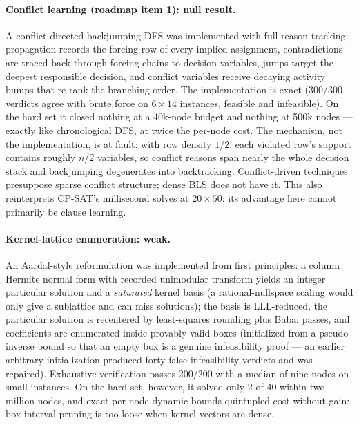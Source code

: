 \documentclass[12pt]{article}
\begin{document}
\paragraph{Conflict learning (roadmap item 1): null result.} A conflict-directed backjumping DFS was implemented with full reason tracking: propagation records the forcing row of every implied assignment, contradictions are traced back through forcing chains to decision variables, jumps target the deepest responsible decision, and conflict variables receive decaying activity bumps that re-rank the branching order. The implementation is exact (300/300 verdicts agree with brute force on $6 \times 14$ instances, feasible and infeasible). On the hard set it closed nothing at a 40k-node budget and nothing at 500k nodes --- exactly like chronological DFS, at twice the per-node cost. The mechanism, not the implementation, is at fault: with row density $1/2$, each violated row's support contains roughly $n/2$ variables, so conflict reasons span nearly the whole decision stack and backjumping degenerates into backtracking. Conflict-driven techniques presuppose sparse conflict structure; dense BLS does not have it. This also reinterprets CP-SAT's millisecond solves at $20 \times 50$: its advantage here cannot primarily be clause learning.

\paragraph{Kernel-lattice enumeration: weak.} An Aardal-style reformulation was implemented from first principles: a column Hermite normal form with recorded unimodular transform yields an integer particular solution and a \emph{saturated} kernel basis (a rational-nullspace scaling would only give a sublattice and can miss solutions); the basis is LLL-reduced, the particular solution is recentered by least-squares rounding plus Babai passes, and coefficients are enumerated inside provably valid boxes (initialized from a pseudo-inverse bound so that an empty box is a genuine infeasibility proof --- an earlier arbitrary initialization produced forty false infeasibility verdicts and was repaired). Exhaustive verification passes 200/200 with a median of nine nodes on small instances. On the hard set, however, it solved only 2 of 40 within two million nodes, and exact per-node dynamic bounds quintupled cost without gain: box-interval pruning is too loose when kernel vectors are dense.
\end{document}

